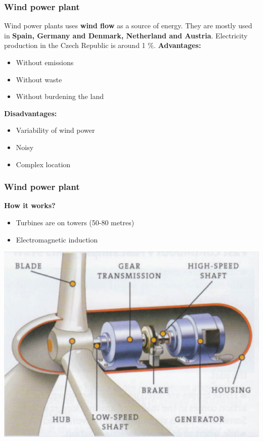 \documentclass[usepdftitle=true]{beamer}
\begin{document}
\begin{frame}
	\frametitle{Wind power plant}
	Wind power plants uses \textbf{wind flow} as a source of energy.
	They are mostly used in \textbf{Spain, Germany and Denmark, Netherland and Austria}.
	Electricity production in the Czech Republic is around 1 \%.
	\vspace{0.25cm}
	\newline
	\textbf{Advantages:}
	\begin{itemize}
		\item Without emissions
		\item Without waste
		\item Without burdening the land
	\end{itemize}
	\textbf{Disadvantages:}
	\begin{itemize}
		\item Variability of wind power
		\item Noisy
		\item Complex location
	\end{itemize}
\end{frame}

\begin{frame}
	\frametitle{Wind power plant}
	\textbf{How it works?}
	\begin{itemize}
		\item Turbines are on towers (50-80 metres)
		\item Electromagnetic induction
	\end{itemize}
	\center
	\includegraphics[scale=0.40]{img/wind_turbine.png}
\end{frame}
\end{document}
